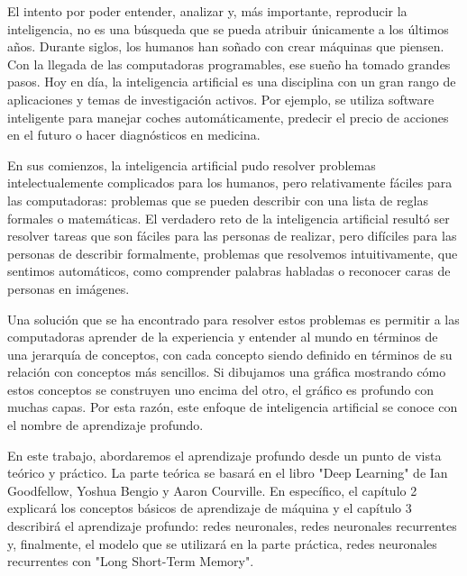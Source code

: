 \noindent
El intento por poder entender, analizar y, más importante, reproducir la inteligencia, no es una búsqueda que se pueda atribuir únicamente a los últimos años. Durante siglos, los humanos han soñado con crear máquinas que piensen. Con la llegada de las computadoras programables, ese sueño ha tomado grandes pasos. Hoy en día, la inteligencia artificial es una disciplina con un gran rango de aplicaciones y temas de investigación activos. Por ejemplo, se utiliza software inteligente para manejar coches automáticamente, predecir el precio de acciones en el futuro o hacer diagnósticos en medicina. \cite{goodfellow-et-al-2016}  \cite{hastie01statisticallearning}
\cite{Haugeland:1985:AIV:4694}

\vspace{1em}

En sus comienzos, la inteligencia artificial pudo resolver problemas intelectualemente complicados para los humanos, pero relativamente fáciles para las computadoras: problemas que se pueden describir con una lista de reglas formales o matemáticas. El verdadero reto de la inteligencia artificial resultó ser resolver tareas que son fáciles para las personas de realizar, pero difíciles para las personas de describir formalmente, problemas que resolvemos intuitivamente, que sentimos automáticos, como comprender palabras habladas o reconocer caras de personas en imágenes. 
\cite{goodfellow-et-al-2016}

\vspace{1em}

Una solución que se ha encontrado para resolver estos problemas es permitir a las computadoras aprender de la experiencia y entender al mundo en términos de una jerarquía de conceptos, con cada concepto siendo definido en términos de su relación con conceptos más sencillos. Si dibujamos una gráfica mostrando cómo estos conceptos se construyen uno encima del otro, el gráfico es profundo con muchas capas. Por esta razón, este enfoque de inteligencia artificial se conoce con el nombre de aprendizaje profundo. 
\cite{deep-learning-methods-and-applications}
\cite{goodfellow-et-al-2016}

\vspace{1em}

En este trabajo, abordaremos el aprendizaje profundo desde un punto de vista teórico y práctico. La parte teórica se basará en el libro "Deep Learning" de Ian Goodfellow, Yoshua Bengio y Aaron Courville. En específico, el capítulo 2 explicará los conceptos básicos de aprendizaje de máquina y el capítulo 3 describirá el aprendizaje profundo: redes neuronales, redes neuronales recurrentes y, finalmente, el modelo que se utilizará en la parte práctica, redes neuronales recurrentes con "Long Short-Term Memory".

